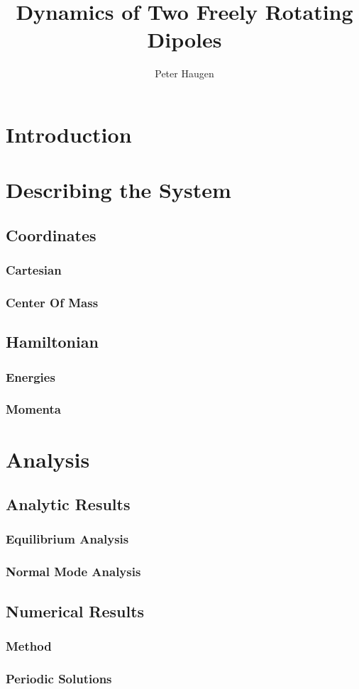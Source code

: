 \documentclass[12pt]{amsart}
\title{Dynamics of Two Freely Rotating Dipoles}
\author{Peter Haugen}
\begin{document}
\maketitle
\tableofcontents

\section{Introduction}


\section{Describing the System}
\subsection{Coordinates}

\subsubsection{Cartesian}
\subsubsection{Center Of Mass}

\subsection{Hamiltonian}

\subsubsection{Energies}
\subsubsection{Momenta}

\section{Analysis}
\subsection{Analytic Results}

\subsubsection{Equilibrium Analysis}
\subsubsection{Normal Mode Analysis}

\subsection{Numerical Results}
\subsubsection{Method}
\subsubsection{Periodic Solutions}
\end{document}
